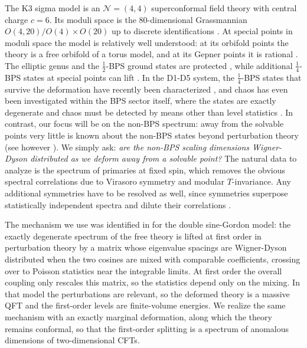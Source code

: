 \documentclass[aps,twocolumn,preprintnumbers,groupedaddress,nofootinbib,prl]{revtex4-2}
\begin{document}
The K3 sigma model is an $\mathcal N=(4,4)$ superconformal field theory with central charge $c=6$. Its moduli space is the $80$-dimensional Grassmannian $O(4,20)/O(4)\times O(20)$ up to discrete identifications \cite{Seiberg:1999xz,Aspinwall:1996mn,Nahm:1999ps}. At special points in moduli space the model is relatively well understood: at its orbifold points the theory is a free orbifold of a torus model, and at its Gepner points it is rational \cite{Gepner:1987vz,Gepner:1987qi}. The elliptic genus and the $\frac12$-BPS ground states are protected \cite{Dijkgraaf:1996xw,Eguchi:2010ej,Eguchi:1987wf}, while additional $\frac14$-BPS states at special points can lift \cite{Keller:2019suk}. In the D1-D5 system, the $\frac14$-BPS states that survive the deformation have recently been characterized \cite{Benjamin:2021zkn,Chang:2025rqy,Bintanja:2026uwk}, and chaos has even been investigated within the BPS sector itself, where the states are exactly degenerate and chaos must be detected by means other than level statistics \cite{Chen:2024oqv,Chen:2026vml,Belin:2026vfd}. In contrast, our focus will be on the non-BPS spectrum: away from the solvable points very little is known about the non-BPS states beyond perturbation theory (see however \cite{Afkhami-Jeddi:2021qkf,Keller:2023ssv}). We simply ask: \emph{are the non-BPS scaling dimensions Wigner-Dyson distributed as we deform away from a solvable point?} The natural data to analyze is the spectrum of primaries at fixed spin, which removes the obvious spectral correlations due to Virasoro symmetry and modular $T$-invariance. Any additional symmetries have to be resolved as well, since symmetries superpose statistically independent spectra and dilute their correlations \cite{Guhr:1997ve}.

The mechanism we use was identified in \cite{Srdinsek:2020bpq} for the double sine-Gordon model: the exactly degenerate spectrum of the free theory is lifted at first order in perturbation theory by a matrix whose eigenvalue spacings are Wigner-Dyson distributed when the two cosines are mixed with comparable coefficients, crossing over to Poisson statistics near the integrable limits. At first order the overall coupling only rescales this matrix, so the statistics depend only on the mixing. In that model the perturbations are relevant, so the deformed theory is a massive QFT and the first-order levels are finite-volume energies. We realize the same mechanism with an exactly marginal deformation, along which the theory remains conformal, so that the first-order splitting is a spectrum of anomalous dimensions of two-dimensional CFTs.
\end{document}
